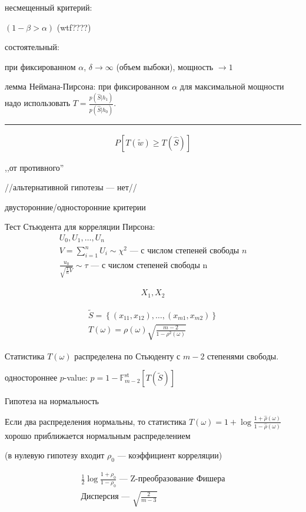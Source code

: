 \documentclass{book}
\begin{document}
несмещенный критерий:

$(1-\beta > \alpha)$ (wtf????)

состоятельный:

при фиксированном $\alpha$,  $\delta \rightarrow \infty$ (объем выбоки), мощность $\rightarrow 1$

лемма Неймана-Пирсона: при фиксированном $\alpha$ для максимальной мощности надо использовать $T=\frac{p(\hat{S}|h_1)}{p(\hat{S}|h_0)}$.

\hrule

\begin{gather*}
  P[T(\tilde{w})\geq T(\hat{S})]
\end{gather*}

,,от противного''

//альтернативной гипотезы --- нет//

двусторонние/односторонние критерии

Тест Стьюдента для корреляции Пирсона:
\begin{gather*}
  U_0, U_1, \dots, U_n\\
  V=\sum_{i=1}^{n} {U_i} \sim \chi^2\textrm{ --- с числом степеней свободы $n$}\\
  \frac{u_0}{\sqrt{\frac{1}{n}V}} \sim \tau\textrm{ --- с числом степеней свободы n}
\end{gather*}

\begin{gather*}
  X_1, X_2
\end{gather*}

\begin{gather*}
  \tilde{S}=\left\{(x_{11},x_{12}), \dots, (x_{m1}, x_{m2})\right\}\\
  T(\omega)=\rho(\omega)\sqrt{\frac{m-2}{1-\rho^2(\omega)}}
\end{gather*}

Статистика $T(\omega)$ распределена по Стьюденту с $m-2$ степенями свободы.

одностороннее $p$-value: $p=1-\mathbb{F}^\mathrm{st}_{m-2}[T(\tilde{S})]$

Гипотеза на нормальность

Если два распределения нормальны, то статистика $T(\omega)=1+\log\frac{1+\hat{\rho}(\omega)}{1-\hat{\rho}(\omega)}$ хорошо приближается нормальным распределением 

(в нулевую гипотезу входит $\rho_0$ --- коэффициент корреляции)

\begin{gather*}
  \frac{1}{2}\log \frac{1+\rho_0}{1-\rho_0} \textrm{ --- Z-преобразование Фишера}\\
  \textrm{Дисперсия --- }\sqrt{\frac{2}{m-3}}
\end{gather*}
\end{document}
